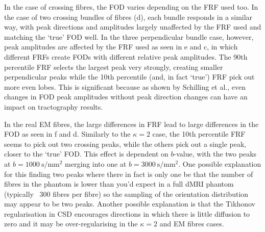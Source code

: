 In the case of crossing fibres, the \ac{FOD} varies depending on the \ac{FRF} used too. In the case of two crossing bundles of fibres (d), each bundle responds in a similar way, with peak directions and amplitudes largely unaffected by the \ac{FRF} used and matching the `true' \ac{FOD} well.
In the three perpendicular bundle case, however, peak amplitudes are affected by the \ac{FRF} used as seen in e and c, in which different \acp{FRF} create \acp{FOD} with different relative peak amplitudes. The 90th percentile \ac{FRF} selects the largest peak very strongly, creating smaller perpendicular peaks while the 10th percentile (and, in fact `true') \ac{FRF} pick out more even lobes.
This is significant because as shown by Schilling et al.\cite{Schilling2019}, even changes in \ac{FOD} peak amplitudes without peak direction changes can have an impact on tractography results.

In the real \ac{EM} fibres, the large differences in \ac{FRF} lead to large differences in the \ac{FOD} as seen in f and d. Similarly to the $\kappa=2$ case, the 10th percentile \ac{FRF} seems to pick out two crossing peaks, while the others pick out a single peak, closer to the `true' \ac{FOD}. This effect is dependent on $b$-value, with the two peaks at $b = \SI{1000}{\second\per\milli\metre\squared}$ merging into one at $b=\SI{3000}{\second\per\milli\metre\squared}$.
One possible explanation for this finding two peaks where there in fact is only one be that the number of fibres in the phantom is lower than you'd expect in a full \ac{dMRI} phantom (typically ~300 fibres per fibre) so the sampling of the orientation distribution may appear to be two peaks. Another possible explanation is that the Tikhonov regularisation in \ac{CSD} \cite{Tournier2007} encourages directions in which there is little diffusion to zero and it may be over-regularising in the $\kappa=2$ and \ac{EM} fibres cases.


